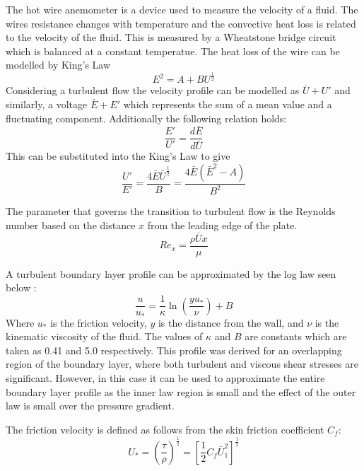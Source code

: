 \documentclass{article}
\begin{document}
The hot wire anemometer is a device used to measure the velocity of a fluid.
The wires resistance changes with temperature and the convective heat loss is related to the velocity of the fluid.
This is measured by a Wheatstone bridge circuit which is balanced at a constant temperatue.
The heat loss of the wire can be modelled by King's Law
\begin{equation}
    E^2 = A + B U^{\frac{1}{2}}
\end{equation}
Considering a turbulent flow the velocity profile can be modelled as $\bar{U} + U'$ and similarly, a voltage $\bar{E} + E'$ which represents the sum of a mean value and a fluctuating component.
Additionally the following relation holds:
\begin{equation}
    \frac{E'}{U'} = \frac{d\bar{E}}{d\bar{U}}
\end{equation}
This can be substituted into the King's Law to give
\begin{equation}
    \frac{U'}{E'} = \frac{4\bar{E}\bar{U}^{\frac{1}{2}}}{B} = \frac{4\bar{E}(\bar{E}^2 - A)}{B^2}
    \label{eq:small_kings}
\end{equation}

The parameter that governs the transition to turbulent flow is the Reynolds number based on the distance $x$ from the leading edge of the plate.
\begin{equation}
    Re_x = \frac{\rho \bar{U}x}{\mu}
\end{equation}

A turbulent boundary layer profile can be approximated by the log law seen below \cite{notes}:
\begin{equation}
    \frac{u}{u_*} = \frac{1}{\kappa} \ln \left( \frac{y u_*}{\nu} \right) + B
\end{equation}
Where $u_*$ is the friction velocity, $y$ is the distance from the wall, and $\nu$ is the kinematic viscosity of the fluid.
The values of $\kappa$ and $B$ are constants which are taken as 0.41 and 5.0 respectively.
This profile was derived for an overlapping region of the boundary layer, where both turbulent and viscous shear stresses are significant.
However, in this case it can be used to approximate the entire boundary layer profile as the inner law region is small and the effect of the outer law is small over the pressure gradient.

The friction velocity is defined as follows from the skin friction coefficient $C_f$:
\begin{equation}
    U_* = \left( \frac{\tau}{\rho} \right)^{\frac{1}{2}} = \left[ \frac{1}{2}C_f \bar{ U}_1^2 \right]^{\frac{1}{2}}
    \label{eq:friction_velocity}
\end{equation}
\end{document}

